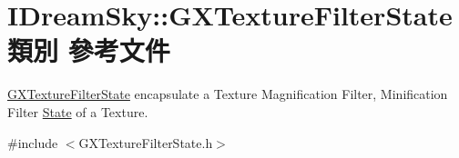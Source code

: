 \hypertarget{class_i_dream_sky_1_1_g_x_texture_filter_state}{}\section{I\+Dream\+Sky\+:\+:G\+X\+Texture\+Filter\+State 類別 參考文件}
\label{class_i_dream_sky_1_1_g_x_texture_filter_state}


\hyperlink{class_i_dream_sky_1_1_g_x_texture_filter_state}{G\+X\+Texture\+Filter\+State} encapsulate a Texture Magnification Filter, Minification Filter \hyperlink{class_i_dream_sky_1_1_state}{State} of a Texture.  




{\ttfamily \#include $<$G\+X\+Texture\+Filter\+State.\+h$>$}


